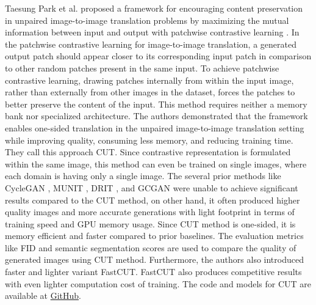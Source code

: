 Taesung Park et al.\cite{park2020contrastive} proposed a framework for encouraging content preservation in unpaired image-to-image translation problems by maximizing the mutual information between input and output with patchwise contrastive learning \cite{oord2019representation}. In the patchwise contrastive learning for image-to-image translation, a generated output patch should appear closer to its corresponding input patch in comparison to other random patches present in the same input. To achieve patchwise contrastive learning, drawing patches internally from within the input image, rather than externally from other images in the dataset, forces the patches to better preserve the content of the input. This method requires neither a memory bank nor specialized architecture. The authors demonstrated that the framework enables one-sided translation in the unpaired image-to-image translation setting while improving quality, consuming less memory, and reducing training time. They call this approach \ac{CUT}. Since contrastive representation is formulated within the same image, this method can even be trained on single images, where each domain is having only a single image. The several prior methods like \ac{CycleGAN} \cite{zhu2020unpaired}, \ac{MUNIT} \cite{liu2018unsupervised}, \ac{DRIT} \cite{lee2019drit}, and \ac{GCGAN} \cite{fu2018geometryconsistent} were unable to achieve significant results compared to the \ac{CUT} method, on other hand, it often produced higher quality images and more accurate generations with light footprint in terms of training speed and GPU memory usage. Since \ac{CUT} method is one-sided, it is memory efficient and faster compared to prior baselines. The evaluation metrics like \ac{FID} \cite{heusel2018gans} and semantic segmentation scores are used to compare the quality of generated images using \ac{CUT} method. Furthermore, the authors also introduced faster and lighter variant \ac{FastCUT}. \ac{FastCUT} also produces competitive results with even lighter computation cost of training. The code and models for \ac{CUT} are available at \href{https://github.com/taesungp/contrastive-unpaired-translation}{GitHub}.



